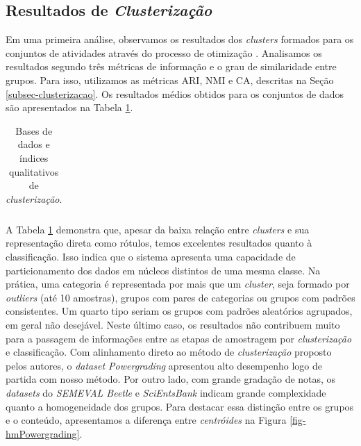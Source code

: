 \subsection{Resultados de \textit{Clusterização}}
\label{sec-res-clustering}

Em uma primeira análise, observamos os resultados dos \textit{clusters} formados para os conjuntos de atividades através do processo de otimização \cite{spalenza2019}. Analisamos os resultados segundo três métricas de informação e o grau de similaridade entre grupos. Para isso, utilizamos as métricas ARI, NMI e CA, descritas na Seção \ref{subsec-clusterizacao}. Os resultados médios obtidos para os conjuntos de dados são apresentados na Tabela \ref{tab-clstr-index}.

\begin{table}[!h]
\begin{center}
\begin{tabular}{r | c c c}
 \hline
 
 \hline
\end{tabular}
\end{center}
\caption{Bases de dados e índices qualitativos de \textit{clusterização}.}
\label{tab-clstr-index}
\end{table}

A Tabela \ref{tab-clstr-index} demonstra que, apesar da baixa relação entre \textit{clusters} e sua representação direta como rótulos, temos excelentes resultados quanto à classificação. Isso indica que o sistema apresenta uma capacidade de particionamento dos dados em núcleos distintos de uma mesma classe. Na prática, uma categoria é representada por mais que um \textit{cluster}, seja formado por \textit{outliers} (até 10 amostras), grupos com pares de categorias ou grupos com padrões consistentes. Um quarto tipo seriam os grupos com padrões aleatórios agrupados, em geral não desejável. Neste último caso, os resultados não contribuem muito para a passagem de informações entre as etapas de amostragem por \textit{clusterização} e classificação. Com alinhamento direto ao método de \textit{clusterização} proposto pelos autores, o \textit{dataset Powergrading} apresentou alto desempenho logo de partida com nosso método. Por outro lado, com grande gradação de notas, os \textit{datasets} do \textit{SEMEVAL Beetle} e \textit{SciEntsBank} indicam grande complexidade quanto a homogeneidade dos grupos. Para destacar essa distinção entre os grupos e o conteúdo, apresentamos a diferença entre \textit{centróides} na Figura \ref{fig-hmPowergrading}.


